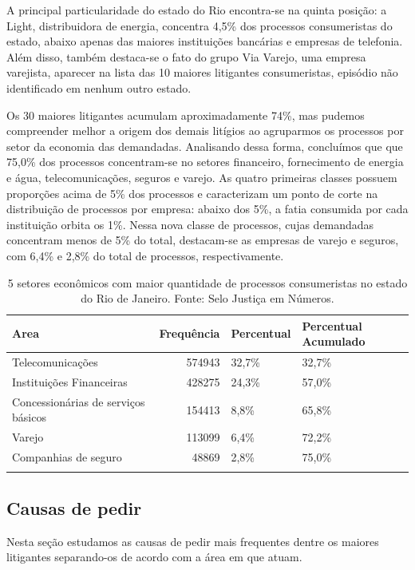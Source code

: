 \documentclass[]{report}
\begin{document}
A principal particularidade do estado do Rio encontra-se na quinta
posição: a Light, distribuidora de energia, concentra 4,5\% dos
processos consumeristas do estado, abaixo apenas das maiores
instituições bancárias e empresas de telefonia. Além disso, também
destaca-se o fato do grupo Via Varejo, uma empresa varejista, aparecer
na lista das 10 maiores litigantes consumeristas, episódio não
identificado em nenhum outro estado.

Os 30 maiores litigantes acumulam aproximadamente 74\%, mas pudemos
compreender melhor a origem dos demais litígios ao agruparmos os
processos por setor da economia das demandadas. Analisando dessa forma,
concluímos que que 75,0\% dos processos concentram-se no setores
financeiro, fornecimento de energia e água, telecomunicações, seguros e
varejo. As quatro primeiras classes possuem proporções acima de 5\% dos
processos e caracterizam um ponto de corte na distribuição de processos
por empresa: abaixo dos 5\%, a fatia consumida por cada instituição
orbita os 1\%. Nessa nova classe de processos, cujas demandadas
concentram menos de 5\% do total, destacam-se as empresas de varejo e
seguros, com 6,4\% e 2,8\% do total de processos, respectivamente.

\begin{longtable}{lrll}
\caption{5 setores econômicos com maior quantidade de processos consumeristas no estado do Rio de Janeiro. Fonte: Selo Justiça em Números.} \\
  \hline
Area & Frequência & Percentual & Percentual Acumulado \\
  \hline
Telecomunicações & 574943 & 32,7\% & 32,7\% \\
  Instituições
Financeiras & 428275 & 24,3\% & 57,0\% \\
  Concessionárias
de serviços
básicos & 154413 & 8,8\% & 65,8\% \\
  Varejo & 113099 & 6,4\% & 72,2\% \\
  Companhias de
seguro & 48869 & 2,8\% & 75,0\% \\
   \hline
\hline
\label{unnamed-chunk-20}
\end{longtable}

\subsection{Causas de pedir}\label{causas-de-pedir-1}

Nesta seção estudamos as causas de pedir mais frequentes dentre os
maiores litigantes separando-os de acordo com a área em que atuam.
\end{document}
